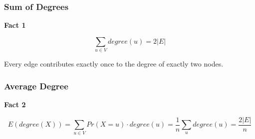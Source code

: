 \begin{frame}
  \frametitle{Sum of Degrees}
  
  \textbf{Fact 1}

  \[
    \sum_{u\in V} degree(u) = 2|E|
  \]
  
  Every edge contributes exactly once to the degree of exactly two nodes.
\end{frame}

\begin{frame}
  \frametitle{Average Degree}
  
  \textbf{Fact 2}
  
  \[
    E(degree(X)) = \sum_{u\in V} Pr(X=u)\cdot degree(u) = \frac{1}{n} \sum_u degree(u) = \frac{2|E|}{n}
  \]
\end{frame}
